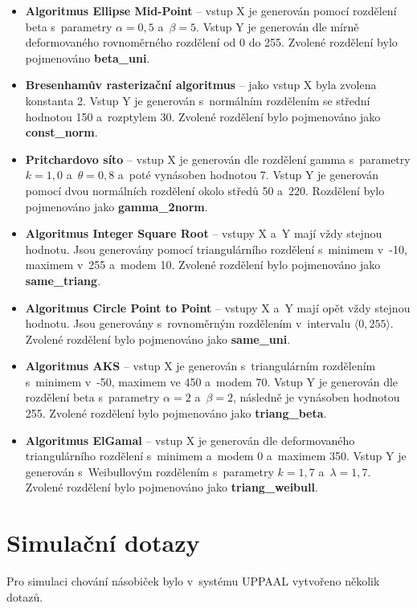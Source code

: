 \begin{itemize}
    \item \textbf{Algoritmus Ellipse Mid-Point} -- vstup X je generován pomocí rozdělení beta s~parametry $\alpha = 0,5$ a~$\beta = 5$. Vstup Y je generován dle mírně deformovaného rovnoměrného rozdělení od 0 do 255. Zvolené rozdělení bylo pojmenováno \textbf{beta\_uni}.
    \item \textbf{Bresenhamův rasterizační algoritmus} -- jako vstup X byla zvolena konstanta 2. Vstup Y je generován s~normálním rozdělením se střední hodnotou 150 a~rozptylem 30. Zvolené rozdělení bylo pojmenováno jako \textbf{const\_norm}.
    \item \textbf{Pritchardovo síto} -- vstup X je generován dle rozdělení gamma s~parametry $k=1,0$ a~$\theta=0,8$ a~poté vynásoben hodnotou 7. Vstup Y je generován pomocí dvou normálních rozdělení okolo středů 50 a~220. Rozdělení bylo pojmenováno jako \textbf{gamma\_2norm}.
    \item \textbf{Algoritmus Integer Square Root} -- vstupy X a~Y mají vždy stejnou hodnotu. Jsou generovány pomocí triangulárního rozdělení s~minimem v~-10, maximem v~255 a~modem 10. Zvolené rozdělení bylo pojmenováno jako \textbf{same\_triang}.
    \item \textbf{Algoritmus Circle Point to Point} -- vstupy X a~Y mají opět vždy stejnou hodnotu. Jsou generovány s~rovnoměrným rozdělením v~intervalu $\langle 0, 255 \rangle$. Zvolené rozdělení bylo pojmenováno jako \textbf{same\_uni}.
    \item \textbf{Algoritmus AKS} -- vstup X je generován s~triangulárním rozdělením s~minimem v~-50, maximem ve 450 a~modem 70. Vstup Y je generován dle rozdělení beta s~parametry $\alpha = 2$ a~$\beta = 2$, následně je vynásoben hodnotou 255. Zvolené rozdělení bylo pojmenováno jako \textbf{triang\_beta}.
    \item \textbf{Algoritmus ElGamal} -- vstup X je generován dle deformovaného triangulárního rozdělení s~minimem a~modem 0 a~maximem 350. Vstup Y je generován s~Weibullovým rozdělením s~parametry $k = 1,7$ a~$\lambda = 1,7$. Zvolené rozdělení bylo pojmenováno jako \textbf{triang\_weibull}.
\end{itemize}

\section{Simulační dotazy} \label{sim_dotazy}
Pro simulaci chování násobiček bylo v~systému UPPAAL vytvořeno několik dotazů.

